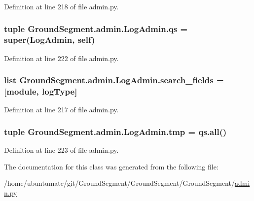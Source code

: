 Definition at line 218 of file admin.\+py.

\hypertarget{class_ground_segment_1_1admin_1_1_log_admin_ab30bff8bf9257f4f38a07a1a0cb2f708}{}
\subsubsection[{qs}]{\setlength{\rightskip}{0pt plus 5cm}tuple Ground\+Segment.\+admin.\+Log\+Admin.\+qs = super({\bf Log\+Admin}, self)\hspace{0.3cm}{\ttfamily [static]}}\label{class_ground_segment_1_1admin_1_1_log_admin_ab30bff8bf9257f4f38a07a1a0cb2f708}


Definition at line 222 of file admin.\+py.

\hypertarget{class_ground_segment_1_1admin_1_1_log_admin_ae4e75207a6f7a882014da7f3fb13e007}{}
\subsubsection[{search\+\_\+fields}]{\setlength{\rightskip}{0pt plus 5cm}list Ground\+Segment.\+admin.\+Log\+Admin.\+search\+\_\+fields = \mbox{[}\textquotesingle{}module\textquotesingle{}, \textquotesingle{}log\+Type\textquotesingle{}\mbox{]}\hspace{0.3cm}{\ttfamily [static]}}\label{class_ground_segment_1_1admin_1_1_log_admin_ae4e75207a6f7a882014da7f3fb13e007}


Definition at line 217 of file admin.\+py.

\hypertarget{class_ground_segment_1_1admin_1_1_log_admin_a3446b8c0fd9063654839bc4b13498736}{}
\subsubsection[{tmp}]{\setlength{\rightskip}{0pt plus 5cm}tuple Ground\+Segment.\+admin.\+Log\+Admin.\+tmp = qs.\+all()\hspace{0.3cm}{\ttfamily [static]}}\label{class_ground_segment_1_1admin_1_1_log_admin_a3446b8c0fd9063654839bc4b13498736}


Definition at line 223 of file admin.\+py.



The documentation for this class was generated from the following file\+:\begin{DoxyCompactItemize}
\item 
/home/ubuntumate/git/\+Ground\+Segment/\+Ground\+Segment/\+Ground\+Segment/\hyperlink{admin_8py}{admin.\+py}\end{DoxyCompactItemize}
